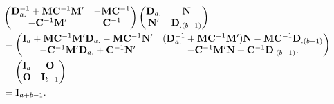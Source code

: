 \begin{align*}
     & \begin{pmatrix}
           \mathbf{D}_{a.}^{-1}+\mathbf{M}\mathbf{C}^{-1}\mathbf{M}' & -\mathbf{M}\mathbf{C}^{-1} \\
           -\mathbf{C}^{-1}\mathbf{M}'                               & \mathbf{C}^{-1}            \\
       \end{pmatrix}\begin{pmatrix}
                        \mathbf{D}_{a.} & \mathbf{N}          \\
                        \mathbf{N}'     & \mathbf{D}_{.(b-1)}
                    \end{pmatrix}                                                                                                                                        \\
     & =\begin{pmatrix}
            \mathbf{I}_a + \mathbf{M}\mathbf{C}^{-1}\mathbf{M}'\mathbf{D}_{a.}-\mathbf{M}\mathbf{C}^{-1}\mathbf{N}' & (\mathbf{D}_{a.}^{-1}+\mathbf{M}\mathbf{C}^{-1}\mathbf{M}')\mathbf{N}-\mathbf{M}\mathbf{C}^{-1}\mathbf{D}_{.(b-1)} \\
            -\mathbf{C}^{-1}\mathbf{M}'\mathbf{D}_{a.}+\mathbf{C}^{-1}\mathbf{N}'                                   & -\mathbf{C}^{-1}\mathbf{M}'\mathbf{N}+\mathbf{C}^{-1}\mathbf{D}_{.(b-1)}.
        \end{pmatrix} \\
     & =\begin{pmatrix}
            \mathbf{I}_a & \mathbf{O}       \\
            \mathbf{O}   & \mathbf{I}_{b-1}
        \end{pmatrix}                                                                                                                                                                                              \\
     & =\mathbf{I}_{a+b-1}.
\end{align*}